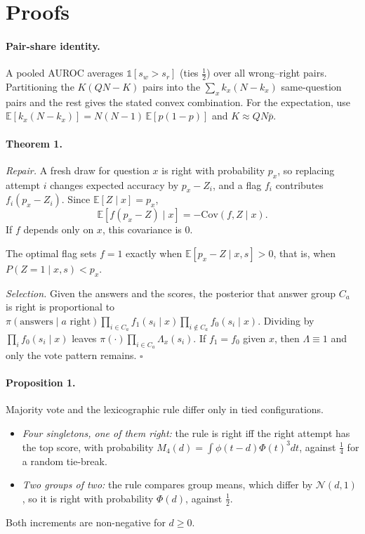 \appendix

\section{Proofs}
\label{app:proofs}

\paragraph{Pair-share identity.}
A pooled AUROC averages $\mathbb 1[s_w>s_r]$ (ties $\frac12$) over all wrong--right pairs. Partitioning the
$K(QN-K)$ pairs into the $\sum_x k_x(N-k_x)$ same-question pairs and the rest gives the stated convex combination.
For the expectation, use $\mathbb E[k_x(N-k_x)]=N(N-1)\,\mathbb E[p(1-p)]$ and $K\approx QN\bar p$.

\paragraph{Theorem 1.}
\emph{Repair.} A fresh draw for question $x$ is right with probability $p_x$, so replacing attempt $i$ changes
expected accuracy by $p_x-Z_i$, and a flag $f_i$ contributes $f_i(p_x-Z_i)$. Since
$\mathbb E[Z\mid x]=p_x$,
\[
\mathbb E[f(p_x-Z)\mid x]=-\mathrm{Cov}(f,Z\mid x).
\]
If $f$ depends only on $x$, this covariance is $0$.

The optimal flag sets $f=1$ exactly when $\mathbb E[p_x-Z\mid x,s]>0$, that is, when $P(Z{=}1\mid x,s)<p_x$.

\emph{Selection.} Given the answers and the scores, the posterior that answer group $C_a$ is right is proportional to
$\pi(\text{answers}\mid a\text{ right})\prod_{i\in C_a}f_1(s_i\mid x)\prod_{i\notin C_a}f_0(s_i\mid x)$. Dividing by
$\prod_i f_0(s_i\mid x)$ leaves $\pi(\cdot)\prod_{i\in C_a}\Lambda_x(s_i)$. If $f_1=f_0$ given $x$, then
$\Lambda\equiv1$ and only the vote pattern remains. $\square$

\paragraph{Proposition 1.}
Majority vote and the lexicographic rule differ only in tied configurations.
\begin{itemize}
\item \emph{Four singletons, one of them right:} the rule is right iff the right attempt has the top score, with
  probability $M_4(d)=\int\phi(t-d)\Phi(t)^3dt$, against $\frac14$ for a random tie-break.
\item \emph{Two groups of two:} the rule compares group means, which differ by $\mathcal N(d,1)$, so it is right with
  probability $\Phi(d)$, against $\frac12$.
\end{itemize}
Both increments are non-negative for $d\ge0$.

